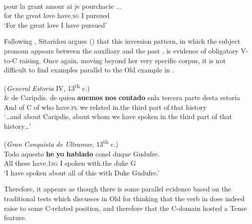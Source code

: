 \documentclass[output=paper]{LSP/langsci}
\begin{document}
\ea%
\label{ex:poole:21}
\citep[(53a)]{Sitaridou2012}\\    
    \gll   pour la grant amour ai \textit{je} pourchacie ...   \\
       	for the great love have.\textsc{sg} I pursued\\
    \glt ‘For the great love I have pursued’ 

    \z

\noindent Following \citealt{Benincà1994}, Sitaridou argues (\citeyear[589--90]{Sitaridou2012})
that this inversion pattern, in which the subject pronoun appears between the auxiliary and the past , is evidence of obligatory V-to-C raising.  Once again, moving beyond her very specific corpus, it is not difficult to find examples parallel to the Old  example in .

\ea%
    \label{ex:poole:22}
      (\textit{General Estoria} IV, 13\textsuperscript{th} c.)\\
    \gll    \& de Caripdis. de quien \textbf{auemos} \textbf{nos} \textbf{contado} enla tercera parte desta estoria  \\
	    And of C         of  who   have.\textsc{pl}  we  related   in.the third  part   of.that history\\
    \glt ‘…and about Caripdis, about whom we have spoken in the   third part of that history…’
    \z


\ea%
    \label{ex:poole:23}
(\textit{Gran Conquista de Ultramar}, 13\textsuperscript{th} c.)\\    
    \gll    Todo aquesto \textbf{he} \textbf{yo} \textbf{hablado} conel duque Gudufre.  \\
	  All    these     have.1\textsc{sg} I spoken with.the duke G\\
    \glt   ‘I have spoken about all of this with Duke Gudufre.'
    \z


\noindent Therefore, it appears as though there is some parallel evidence based on the traditional tests which \citet{Sitaridou2012} discusses in Old  for thinking that the verb in  does indeed raise to some C-related position, and therefore that the C-domain hosted a Tense feature.
\end{document}
